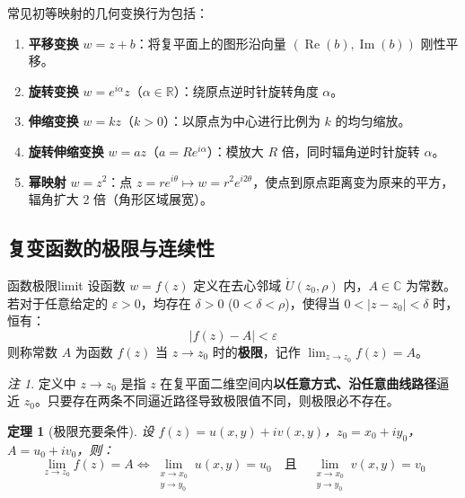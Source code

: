 \documentclass[11pt,a4paper,fontset=fandol]{ctexart}
\newtheorem{theorem}{定理}[section]
\theoremstyle{remark}
\newtheorem{remark}{注}[section]
\begin{document}
常见初等映射的几何变换行为包括：
\begin{enumerate}
    \item \textbf{平移变换} $w = z + b$：将复平面上的图形沿向量 $(\operatorname{Re}(b), \operatorname{Im}(b))$ 刚性平移。
    \item \textbf{旋转变换} $w = e^{i\alpha} z$（$\alpha \in \mathbb{R}$）：绕原点逆时针旋转角度 $\alpha$。
    \item \textbf{伸缩变换} $w = k z$（$k > 0$）：以原点为中心进行比例为 $k$ 的均匀缩放。
    \item \textbf{旋转伸缩变换} $w = a z$（$a = R e^{i\alpha}$）：模放大 $R$ 倍，同时辐角逆时针旋转 $\alpha$。
    \item \textbf{幂映射} $w = z^2$：点 $z = r e^{i\theta} \mapsto w = r^2 e^{i 2\theta}$，使点到原点距离变为原来的平方，辐角扩大 2 倍（角形区域展宽）。
\end{enumerate}

\subsection{复变函数的极限与连续性}

\begin{definition}{函数极限}{limit}
设函数 $w = f(z)$ 定义在去心邻域 $\mathring{U}(z_0, \rho)$ 内，$A \in \mathbb{C}$ 为常数。若对于任意给定的 $\varepsilon > 0$，均存在 $\delta > 0$ ($0 < \delta < \rho$)，使得当 $0 < |z - z_0| < \delta$ 时，恒有：
\begin{equation}
    |f(z) - A| < \varepsilon
\end{equation}
则称常数 $A$ 为函数 $f(z)$ 当 $z \to z_0$ 时的\textbf{极限}，记作 $\lim_{z \to z_0} f(z) = A$。
\end{definition}

\begin{remark}
定义中 $z \to z_0$ 是指 $z$ 在复平面二维空间内\textbf{以任意方式、沿任意曲线路径}逼近 $z_0$。只要存在两条不同逼近路径导致极限值不同，则极限必不存在。
\end{remark}

\begin{theorem}[极限充要条件]
设 $f(z) = u(x, y) + i v(x, y)$，$z_0 = x_0 + i y_0$，$A = u_0 + i v_0$，则：
\begin{equation}
    \lim_{z \to z_0} f(z) = A \iff \lim_{\substack{x \to x_0 \\ y \to y_0}} u(x, y) = u_0 \quad \text{且} \quad \lim_{\substack{x \to x_0 \\ y \to y_0}} v(x, y) = v_0
\end{equation}
\end{theorem}
\end{document}
